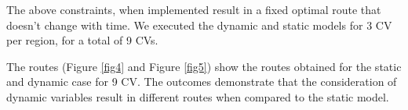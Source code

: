 \documentclass[12pt]{article}
\begin{document}
The above constraints, when implemented result in a fixed optimal route that doesn't change with time. We executed the dynamic and static models for 3 CV per region, for a total of 9 CVs.


The routes (Figure \ref{fig4} and Figure \ref{fig5}) show the routes obtained for the static and dynamic case for 9 CV. The outcomes demonstrate that the consideration of dynamic variables result in different routes when compared to the static model.
\end{document}
